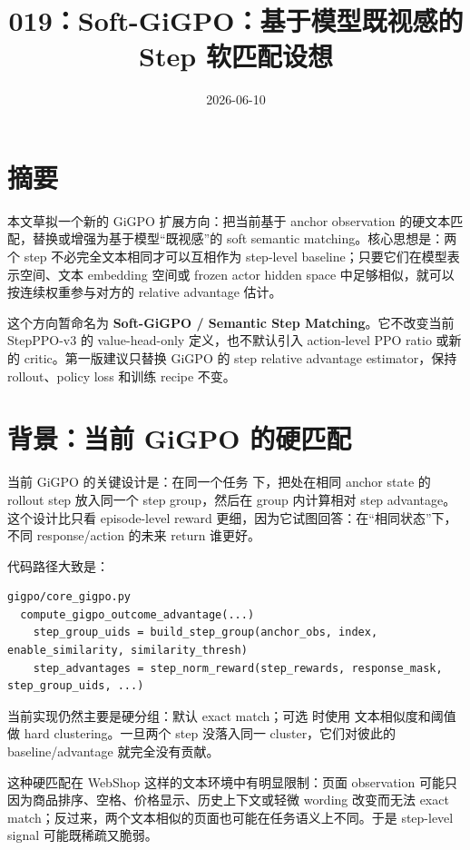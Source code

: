 \documentclass[10pt]{ctexart}
\title{019：Soft-GiGPO：基于模型既视感的 Step 软匹配设想}
\author{}
\date{2026-06-10}
\begin{document}
\maketitle
\vspace{-1.2em}

\section*{摘要}
本文草拟一个新的 GiGPO 扩展方向：把当前基于 anchor observation 的硬文本匹配，替换或增强为基于模型“既视感”的 soft semantic matching。核心思想是：两个 step 不必完全文本相同才可以互相作为 step-level baseline；只要它们在模型表示空间、文本 embedding 空间或 frozen actor hidden space 中足够相似，就可以按连续权重参与对方的 relative advantage 估计。

这个方向暂命名为 \textbf{Soft-GiGPO / Semantic Step Matching}。它不改变当前 StepPPO-v3 的 value-head-only 定义，也不默认引入 action-level PPO ratio 或新的 critic。第一版建议只替换 GiGPO 的 step relative advantage estimator，保持 rollout、policy loss 和训练 recipe 不变。

\section{背景：当前 GiGPO 的硬匹配}
当前 GiGPO 的关键设计是：在同一个任务  下，把处在相同 anchor state 的 rollout step 放入同一个 step group，然后在 group 内计算相对 step advantage。这个设计比只看 episode-level reward 更细，因为它试图回答：在“相同状态”下，不同 response/action 的未来 return 谁更好。

代码路径大致是：
\begin{lstlisting}
gigpo/core_gigpo.py
  compute_gigpo_outcome_advantage(...)
    step_group_uids = build_step_group(anchor_obs, index, enable_similarity, similarity_thresh)
    step_advantages = step_norm_reward(step_rewards, response_mask, step_group_uids, ...)
\end{lstlisting}

当前实现仍然主要是硬分组：默认 exact match；可选  时使用  文本相似度和阈值做 hard clustering。一旦两个 step 没落入同一 cluster，它们对彼此的 baseline/advantage 就完全没有贡献。

这种硬匹配在 WebShop 这样的文本环境中有明显限制：页面 observation 可能只因为商品排序、空格、价格显示、历史上下文或轻微 wording 改变而无法 exact match；反过来，两个文本相似的页面也可能在任务语义上不同。于是 step-level signal 可能既稀疏又脆弱。
\end{document}

